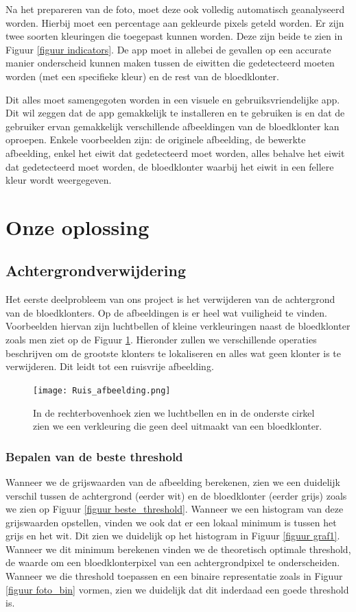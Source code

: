 \documentclass[a4paper,kulak]{kulakarticle}
\begin{document}
		Na het prepareren van de foto, moet deze ook volledig automatisch geanalyseerd worden. Hierbij moet een percentage aan gekleurde pixels geteld worden. Er zijn twee soorten kleuringen die toegepast kunnen worden. Deze zijn beide te zien in Figuur \ref{figuur indicators}. De app moet in allebei de gevallen op een accurate manier onderscheid kunnen maken tussen de eiwitten die gedetecteerd moeten worden (met een specifieke kleur) en de rest van de bloedklonter.
		
		Dit alles moet samengegoten worden in een visuele en gebruiksvriendelijke app. Dit wil zeggen dat de app gemakkelijk te installeren en te gebruiken is en dat de gebruiker ervan gemakkelijk verschillende afbeeldingen van de bloedklonter kan oproepen. Enkele voorbeelden zijn: de originele afbeelding, de bewerkte afbeelding, enkel het eiwit dat gedetecteerd moet worden, alles behalve het eiwit dat gedetecteerd moet worden, de bloedklonter waarbij het eiwit in een fellere kleur wordt weergegeven.	
	
	\section{Onze oplossing}

		\subsection{Achtergrondverwijdering}
			Het eerste deelprobleem van ons project is het verwijderen van de achtergrond van de bloedklonters. Op de afbeeldingen is er heel wat vuiligheid te vinden. Voorbeelden hiervan zijn luchtbellen of kleine verkleuringen naast de bloedklonter zoals men ziet op de Figuur \ref{figuur achtergrondverwijdering}. Hieronder zullen we verschillende operaties beschrijven om de grootste klonters te lokaliseren en alles wat geen klonter is te verwijderen. Dit leidt tot een ruisvrije afbeelding.

		\begin{figure}[h]
			\centering
			\texttt{[image: Ruis\_afbeelding.png]}	
			\caption{In de rechterbovenhoek zien we luchtbellen en in de onderste cirkel zien we een verkleuring die geen deel uitmaakt van een bloedklonter.}
			\label{figuur achtergrondverwijdering}
		\end{figure}

	\subsubsection{Bepalen van de beste threshold}
		Wanneer we de grijswaarden van de afbeelding berekenen, zien we een duidelijk verschil tussen de achtergrond (eerder wit) en de bloedklonter (eerder grijs) zoals we zien op Figuur \ref{figuur beste_threshold}. Wanneer we een histogram van deze grijswaarden opstellen, vinden we ook dat er een lokaal minimum is tussen het grijs en het wit. Dit zien we duidelijk op het histogram in Figuur \ref{figuur graf1}. Wanneer we dit minimum berekenen vinden we de theoretisch optimale threshold, de waarde om een bloedklonterpixel van een achtergrondpixel te onderscheiden. Wanneer we die threshold toepassen en een binaire representatie zoals in Figuur \ref{figuur foto_bin} vormen, zien we duidelijk dat dit inderdaad een goede threshold is.
\end{document}
